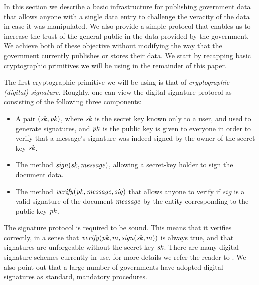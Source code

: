 
In this section we describe a basic infrastructure for publishing government data that allows anyone with a single data entry to challenge the veracity of the data in case it was manipulated. We also provide a simple protocol that enables us to increase the trust of the general public in the data provided by the government. We achieve both of these objective without modifying the way that the government currently publishes or stores their data. We start by recapping basic cryptographic primitives we will be using in the remainder of this paper.

\medskip
{} The first cryptographic primitive we will be using is that of {\em cryptographic (digital) signature}. Roughly, one can view the digital signature protocol as consisting of the following three components:
\begin{itemize}
\item A pair $(\mathit{sk},\mathit{pk})$, where $\mathit{sk}$ is the secret key known only to a user, and used to generate signatures, and $\mathit{pk}$ is the public key is given to everyone in order to verify that a message's signature was indeed signed by the owner of the secret key $\mathit{sk}$.
\item The method $\mathit{sign}(\mathit{sk},\mathit{message})$, allowing a secret-key holder to sign the document data. 
\item The method $\mathit{verify}(\mathit{pk},\mathit{message},\mathit{sig})$ that allows anyone to verify if $\mathit{sig}$ is a valid signature of the document $\mathit{message}$ by the entity corresponding to the public key $\mathit{pk}$.
\end{itemize}
The signature protocol is required to be sound. This means that it verifies correctly, in a sense that $\mathit{verify}(\mathit{pk},m,\mathit{sign}(\mathit{sk},m))$ is always true, and that signatures are unforgeable without the secret key $\mathit{sk}$. There are many digital signature schemes currently in use, for more details we refer the reader to \cite{KatzLindell2014}. We also point out that a large number of governments have adopted digital signatures as standard, mandatory procedures.

